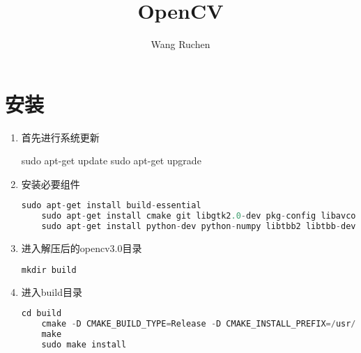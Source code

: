 \documentclass[12pt]{article}
\begin{document}
\title{\vspace{-2em}OpenCV\vspace{-0.7em}}
\author{Wang Ruchen}
\maketitle
\thispagestyle{fancy}
\maketitle
\tableofcontents 

\section{安装}

\begin{enumerate}
\item 首先进行系统更新
     \begin{bash}
    sudo apt-get update 
    sudo apt-get upgrade
     \end{bash}
\item 安装必要组件
    \begin{lstlisting}[language=C++]
    sudo apt-get install build-essential
    sudo apt-get install cmake git libgtk2.0-dev pkg-config libavcodec-dev libavformat-dev libswscale-dev
    sudo apt-get install python-dev python-numpy libtbb2 libtbb-dev libjpeg-dev libpng-dev libtiff-dev libjasper-dev libdc1394-22-dev
    \end{lstlisting}
\item 进入解压后的opencv3.0目录
    \begin{lstlisting}[language=C++]
    mkdir build
    \end{lstlisting}
\item 进入build目录
    \begin{lstlisting}[language=C++]
    cd build
    cmake -D CMAKE_BUILD_TYPE=Release -D CMAKE_INSTALL_PREFIX=/usr/local ..
    make
    sudo make install
    \end{lstlisting}
\end{enumerate}
\end{document}

